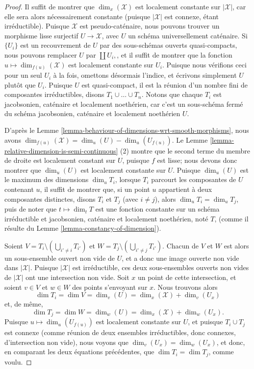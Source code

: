 \begin{proof}
Il suffit de montrer que $\dim_x(\mathcal{X})$ est localement constante sur
$|\mathcal{X}|$,
car elle sera alors nécessairement constante (puisque $|\mathcal{X}|$ est connexe,
étant irréductible). Puisque $\mathcal{X}$ est pseudo-caténaire,
nous pouvons trouver un morphisme lisse surjectif $U \to \mathcal{X}$, avec $U$
un schéma universellement caténaire. Si $\{U_i\}$ est un
recouvrement de $U$ par des sous-schémas ouverts quasi-compacts, nous pouvons remplacer
$U$ par $\coprod U_i,$, et
il suffit de montrer que
la fonction $u \mapsto \dim_{f(u)}(\mathcal{X})$ est localement constante sur $U_i$.
Puisque nous vérifions ceci pour un seul $U_i$ à la fois, omettons désormais l'indice,
et écrivons simplement $U$ plutôt que $U_i$.
Puisque $U$ est quasi-compact, il
est la réunion d'un nombre fini de composantes irréductibles,
disons $T_1 \cup \ldots \cup T_n$. Notons que chaque $T_i$ est jacobsonien,
caténaire et localement noethérien,
car c'est un sous-schéma fermé du schéma jacobsonien, caténaire et localement noethérien
$U$.

\medskip\noindent
D'après le Lemme \ref{lemma-behaviour-of-dimensions-wrt-smooth-morphisms}, nous avons
$\dim_{f(u)}(\mathcal{X}) = \dim_{u}(U) - \dim_{u}(U_{f(u)}).$
Le Lemme \ref{lemma-relative-dimension-is-semi-continuous} (2)
montre que le second terme du membre de droite est localement
constant sur $U$, puisque $f$ est lisse;
nous devons donc montrer que $\dim_u(U)$
est localement constante sur $U$. Puisque $\dim_u(U)$ est le maximum
des dimensions $\dim_u T_i$, lorsque $T_i$ parcourt les composantes
de $U$ contenant $u$, il suffit de montrer
que, si un point $u$ appartient à deux composantes distinctes,
disons $T_i$ et $T_j$ (avec $i \neq j$),
alors $\dim_u T_i = \dim_u T_j$,
puis de noter que $t\mapsto \dim_t T$ est une fonction constante
sur un schéma irréductible et jacobsonien,
caténaire et localement noethérien, noté $T$,
(comme il résulte du Lemme \ref{lemma-constancy-of-dimension}).

\medskip\noindent
Soient $V = T_i \setminus (\bigcup_{i' \neq i} T_{i'})$
et $W = T_j \setminus (\bigcup_{i' \neq j} T_{i'})$.
Chacun de $V$ et $W$ est alors un sous-ensemble ouvert non vide de $U$,
et a donc une image ouverte non vide dans $|\mathcal{X}|$. Puisque $|\mathcal{X}|$ est
irréductible,
ces deux sous-ensembles ouverts non vides de $|\mathcal{X}|$ ont une intersection
non vide.
Soit $x$ un point de cette intersection, et soient $v \in V$ et
$w\in W$ des points s'envoyant sur $x$.
Nous trouvons alors
$$
\dim T_i = \dim V = \dim_v (U) = \dim_x (\mathcal{X}) + \dim_v (U_x)
$$
et, de même,
$$
\dim T_j = \dim W = \dim_w (U) = \dim_x (\mathcal{X}) + \dim_w (U_x).
$$
Puisque $u \mapsto \dim_u (U_{f(u)})$ est localement constante sur $U$,
et puisque $T_i \cup T_j$ est connexe (comme réunion de deux ensembles irréductibles,
donc connexes, d'intersection non vide),
nous voyons que $\dim_v (U_x) = \dim_w(U_x)$,
et donc, en comparant les deux équations précédentes,
que $\dim T_i = \dim T_j$, comme voulu.
\end{proof}

